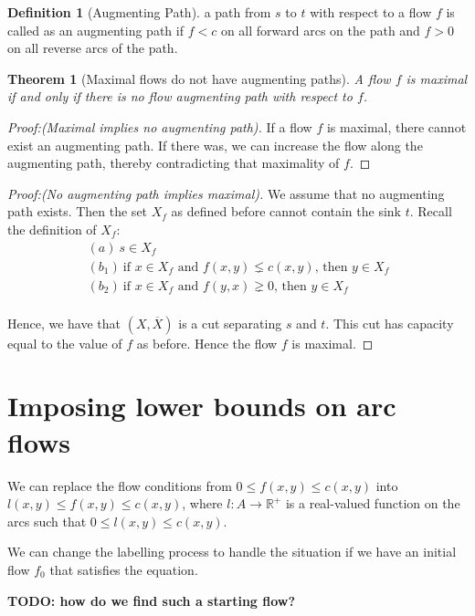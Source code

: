 \documentclass[titlepage]{article}
\newcommand{\R}{\mathbb{R}}
\newcommand{\Xbar}{\ensuremath{\overline{X}}}
\theoremstyle{plain}
\newtheorem{theorem}{Theorem}
\theoremstyle{definition}
\newtheorem{definition}{Definition}[theorem]
\theoremstyle{remark}
\begin{document}
\begin{definition}[Augmenting Path]
    a path from $s$ to $t$ with respect to a flow $f$ is called as an
    augmenting path if $f < c$ on all forward arcs on the path and $f > 0$
    on all reverse arcs of the path.
\end{definition}

\begin{theorem}[Maximal flows do not have augmenting paths]
    A flow $f$ is maximal if and only if there is no flow augmenting path
    with respect to $f$.
\end{theorem}
\begin{proof}[Proof:(Maximal implies no augmenting path)]
    If a flow $f$ is maximal, there cannot exist an augmenting path. If there
    was, we can increase the flow along the augmenting path, thereby
    contradicting that maximality of $f$.
\end{proof}
\begin{proof}[Proof:(No augmenting path implies maximal)]
    We assume that no augmenting path exists. Then the set $X_f$ as defined
    before cannot contain the sink $t$. Recall the definition of $X_f$:
    \begin{align*}
        &(a) ~ s \in X_f \\
        &(b_1) ~ \text{if $x \in X_f$ and $f(x, y) \lneq c(x, y)$, then $y \in X_f$ } \\
        &(b_2) ~ \text{if $x \in X_f$ and $f(y, x) \gneq 0$, then $y \in X_f$ } \\
    \end{align*}

    Hence, we have that $(X, \Xbar)$ is a cut separating $s$ and $t$. This cut
    has capacity equal to the value of $f$ as before. Hence the flow $f$
    is maximal.
\end{proof}

\section{Imposing lower bounds on arc flows}
We can replace the flow conditions from $0 \leq f(x, y) \leq c(x, y)$ into
$l(x, y) \leq f(x, y) \leq c(x, y)$, where $l: A \rightarrow \R^+$ is a real-valued
function on the arcs such that $0 \leq l(x, y) \leq c(x, y)$.


We can change the labelling process to handle the situation if we have an
initial flow $f_0$ that satisfies the equation.

\textbf{TODO: how do we find such a starting flow?}
\end{document}
